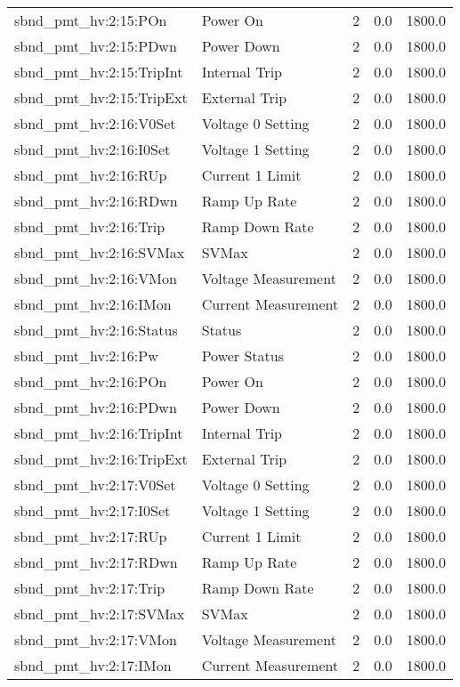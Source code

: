 \begin{center}
\begin{longtable}{l | l l l l }
sbnd\_pmt\_hv:2:15:POn & Power On & 2 & 0.0 & 1800.0\\ 
sbnd\_pmt\_hv:2:15:PDwn & Power Down & 2 & 0.0 & 1800.0\\ 
sbnd\_pmt\_hv:2:15:TripInt & Internal Trip & 2 & 0.0 & 1800.0\\ 
sbnd\_pmt\_hv:2:15:TripExt & External Trip & 2 & 0.0 & 1800.0\\ 
sbnd\_pmt\_hv:2:16:V0Set & Voltage 0 Setting & 2 & 0.0 & 1800.0\\ 
sbnd\_pmt\_hv:2:16:I0Set & Voltage 1 Setting & 2 & 0.0 & 1800.0\\ 
sbnd\_pmt\_hv:2:16:RUp & Current 1 Limit & 2 & 0.0 & 1800.0\\ 
sbnd\_pmt\_hv:2:16:RDwn & Ramp Up Rate & 2 & 0.0 & 1800.0\\ 
sbnd\_pmt\_hv:2:16:Trip & Ramp Down Rate & 2 & 0.0 & 1800.0\\ 
sbnd\_pmt\_hv:2:16:SVMax & SVMax & 2 & 0.0 & 1800.0\\ 
sbnd\_pmt\_hv:2:16:VMon & Voltage Measurement & 2 & 0.0 & 1800.0\\ 
sbnd\_pmt\_hv:2:16:IMon & Current Measurement & 2 & 0.0 & 1800.0\\ 
sbnd\_pmt\_hv:2:16:Status & Status & 2 & 0.0 & 1800.0\\ 
sbnd\_pmt\_hv:2:16:Pw & Power Status & 2 & 0.0 & 1800.0\\ 
sbnd\_pmt\_hv:2:16:POn & Power On & 2 & 0.0 & 1800.0\\ 
sbnd\_pmt\_hv:2:16:PDwn & Power Down & 2 & 0.0 & 1800.0\\ 
sbnd\_pmt\_hv:2:16:TripInt & Internal Trip & 2 & 0.0 & 1800.0\\ 
sbnd\_pmt\_hv:2:16:TripExt & External Trip & 2 & 0.0 & 1800.0\\ 
sbnd\_pmt\_hv:2:17:V0Set & Voltage 0 Setting & 2 & 0.0 & 1800.0\\ 
sbnd\_pmt\_hv:2:17:I0Set & Voltage 1 Setting & 2 & 0.0 & 1800.0\\ 
sbnd\_pmt\_hv:2:17:RUp & Current 1 Limit & 2 & 0.0 & 1800.0\\ 
sbnd\_pmt\_hv:2:17:RDwn & Ramp Up Rate & 2 & 0.0 & 1800.0\\ 
sbnd\_pmt\_hv:2:17:Trip & Ramp Down Rate & 2 & 0.0 & 1800.0\\ 
sbnd\_pmt\_hv:2:17:SVMax & SVMax & 2 & 0.0 & 1800.0\\ 
sbnd\_pmt\_hv:2:17:VMon & Voltage Measurement & 2 & 0.0 & 1800.0\\ 
sbnd\_pmt\_hv:2:17:IMon & Current Measurement & 2 & 0.0 & 1800.0\\ 

\end{longtable}
\end{center}
